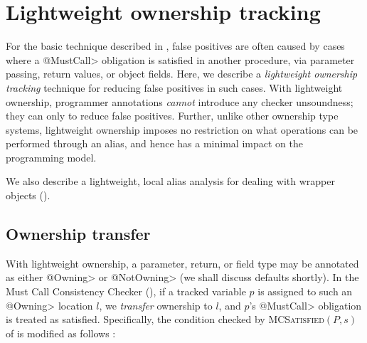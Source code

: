 \section{Lightweight ownership tracking}
\label{sec:lightweight-ownership}

For the basic technique described in , false
positives are often caused by cases where a \<@MustCall> obligation is satisfied
in another procedure, via parameter passing, return values, or object fields.
Here, we describe a \emph{lightweight ownership tracking} technique for reducing
false positives in such cases.  With lightweight ownership, programmer
annotations \emph{cannot} introduce any checker unsoundness; they can only to
reduce false positives.  Further, unlike other ownership type systems,
lightweight ownership imposes no restriction on what operations can be performed
through an alias, and hence has a minimal impact on the programming model.


We also describe a lightweight, local alias analysis for dealing with wrapper
objects ().

\subsection{Ownership transfer}
\label{sec:ownership-transfer}


With lightweight ownership, a parameter, return, or field type may be annotated
as either \<@Owning> or \<@NotOwning> (we shall discuss defaults shortly).  In
the Must Call Consistency Checker (), if a tracked
variable $p$ is assigned to such an \<@Owning> location $l$, we \emph{transfer}
ownership to $l$, and $p$'s \<@MustCall> obligation
is treated as satisfied. Specifically, the condition checked by
\textsc{MCSatisfied}$(P,s)$ of  is modified as follows
:

